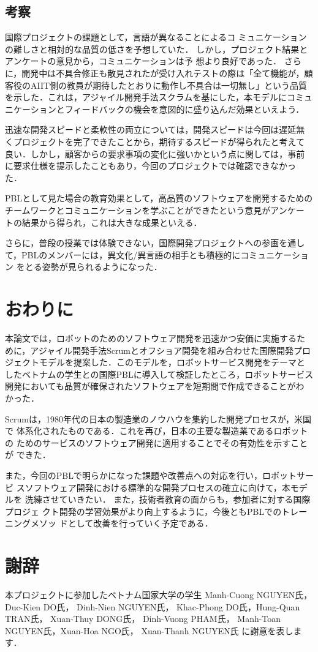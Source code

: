 \documentclass[a4j, 12Q, twocolumn, twoside]{jsarticle}
\begin{document}
\subsection{考察}

国際プロジェクトの課題として，言語が異なることによるコ
ミュニケーションの難しさと相対的な品質の低さを予想していた．
しかし，プロジェクト結果とアンケートの意見から，コミュニケーションは予
想より良好であった．
さらに，開発中は不具合修正も散見されたが受け入れテストの際は「全て機能が，顧客役のAIIT側の教員が期待したとおりに動作し不具合は一切無し」という品質を示した．これは，アジャイル開発手法スクラムを基にした，本モデルにコミュニケーションとフィードバックの機会を意図的に盛り込んだ効果といえよう．


迅速な開発スピードと柔軟性の両立については，開発スピードは今回は遅延無
くプロジェクトを完了できたことから，期待するスピードが得られたと考えて
良い．しかし，顧客からの要求事項の変化に強いかという点に関しては，事前
に要求仕様を提示したこともあり，今回のプロジェクトでは確認できなかっ
た．

PBLとして見た場合の教育効果として，高品質のソフトウェアを開発するための
チームワークとコミュニケーションを学ぶことができたという意見がアンケー
トの結果から得られ，これは大きな成果といえる．

さらに，普段の授業では体験できない，国際開発プロジェクトへの参画を通し
て，PBLのメンバーには，異文化/異言語の相手とも積極的にコミュニケーション
をとる姿勢が見られるようになった．

\section{おわりに}\label{sec:concludion}
本論文では，ロボットのためのソフトウェア開発を迅速かつ安価に実施するた
めに，アジャイル開発手法Scrumとオフショア開発を組み合わせた国際開発プロ
ジェクトモデルを提案した．このモデルを，ロボットサービス開発をテーマと
したベトナムの学生との国際PBLに導入して検証したところ，ロボットサービス
開発においても品質が確保されたソフトウェアを短期間で作成できることがわ
かった．



Scrumは，1980年代の日本の製造業のノウハウを集約した開発プロセスが，米国で
体系化されたものである．これを再び，日本の主要な製造業であるロボットの
ためのサービスのソフトウェア開発に適用することでその有効性を示すことが
できた．

また，今回のPBLで明らかになった課題や改善点への対応を行い，ロボットサービ
スソフトウェア開発における標準的な開発プロセスの確立に向けて，本モデルを
洗練させていきたい． また，技術者教育の面からも，参加者に対する国際プロジェ
クト開発の学習効果がより向上するように，今後ともPBLでのトレーニングメソッ
ドとして改善を行っていく予定である．

\section*{謝辞}
本プロジェクトに参加したベトナム国家大学の学生
Manh-Cuong NGUYEN氏， Duc-Kien DO氏， Dinh-Nien NGUYEN氏，
Khac-Phong DO氏，Hung-Quan TRAN氏， Xuan-Thuy DONG氏，
Dinh-Vuong PHAM氏， Manh-Toan NGUYEN氏，Xuan-Hoa NGO氏， Xuan-Thanh NGUYEN氏
に謝意を表します．



\end{document}
